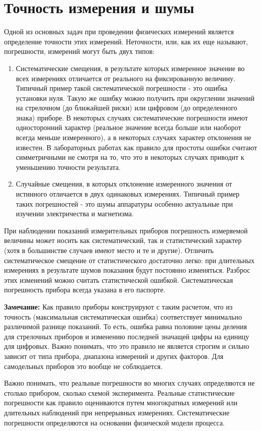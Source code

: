 \section{Точность измерения и шумы}

Одной из основных задач при проведении физических измерений является определение точности этих измерений. Неточности, или, как их еще называют, погрешности, измерений могут быть двух типов:

\begin{enumerate}
	\item Систематические смещения, в результате которых измеренное значение во всех измерениях отличается от реального на фиксированную величину. Типичный пример такой систематической погрешности - это ошибка установки нуля. Такую же ошибку можно получить при округлении значений на стрелочном (до ближайшей риски) или цифровом (до определенного знака) приборе. В некоторых случаях систематические погрешности имеют односторонний характер (реальное значение всегда больше или наоборот всегда меньше измеренного), а в некоторых случаях характер отклонения не известен. В лабораторных работах как правило для простоты ошибки считают симметричными не смотря на то, что это в некоторых случаях приводит к уменьшению точности результата.

	\item Случайные смещения, в которых отклонение измеренного значения от истинного отличается в двух одинаковых измерениях. Типичный пример таких погрешностей - это шумы аппаратуры особенно актуальные при изучении электричества и магнетизма.
\end{enumerate}

При наблюдении показаний измерительных приборов погрешность измеряемой величины может носить как систематический, так и статистический характер (хотя в большинстве случаев имеют место и те и другие). Отличить систематическое смещение от статистического достаточно легко: при длительных измерениях в результате шумов показания будут постоянно изменяться. Разброс этих изменений можно считать статистической ошибкой. Систематическая погрешность прибора всегда указана в его паспорте.

\textbf{Замечание:} Как правило приборы конструируют с таким расчетом, что из точность (максимальная систематическая ошибка) соответствует минимально различимой разнице показаний. То есть, ошибка равна половине цены деления для стрелочных приборов и изменению последней значащей цифры на единицу для цифровых. Важно понимать, что это правило не является строгим и сильно зависит от типа прибора, диапазона измерений и других факторов. Для самодельных приборов это вообще не соблюдается.

Важно понимать, что реальные погрешности во многих случаях определяются не столько прибором, сколько схемой эксперимента. Реальные статистические погрешности как правило оцениваются путем многократных измерений или длительных наблюдений при непрерывных измерениях. Систематические погрешности определяются на основании физической модели процесса.